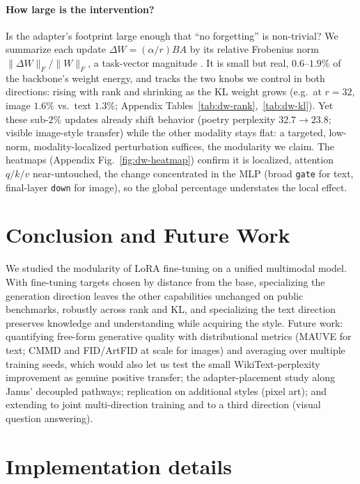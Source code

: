 \documentclass{article}
\begin{document}
\paragraph{How large is the intervention?}
Is the adapter's footprint large enough that ``no forgetting'' is non-trivial? We
summarize each update $\Delta W=(\alpha/r)BA$ by its relative Frobenius norm
$\lVert\Delta W\rVert_F/\lVert W\rVert_F$, a task-vector magnitude
\citep{ilharco2023task}. It is small but real, $0.6$--$1.9\%$ of the backbone's
weight energy, and tracks the two knobs we control in both directions: rising
with rank and shrinking as the KL weight grows (e.g.\ at $r{=}32$, image $1.6\%$
vs.\ text $1.3\%$; Appendix Tables~\ref{tab:dw-rank},~\ref{tab:dw-kl}). Yet these
sub-$2\%$ updates already shift behavior (poetry perplexity $32.7{\to}23.8$;
visible image-style transfer) while the other modality stays flat: a targeted,
low-norm, modality-localized perturbation suffices, the modularity we claim. The
heatmaps (Appendix Fig.~\ref{fig:dw-heatmap}) confirm it is localized, attention
$q/k/v$ near-untouched, the change concentrated in the MLP (broad \texttt{gate}
for text, final-layer \texttt{down} for image), so the global percentage
understates the local effect.
\section{Conclusion and Future Work}
We studied the modularity of LoRA fine-tuning on a unified multimodal model. With
fine-tuning targets chosen by distance from the base, specializing the generation
direction leaves the other capabilities unchanged on public benchmarks, robustly
across rank and KL, and specializing the text direction preserves knowledge and
understanding while acquiring the style. Future work: quantifying free-form
generative quality with distributional metrics (MAUVE for text; CMMD and
FID/ArtFID at scale for images) and averaging over multiple training seeds, which
would also let us test the small WikiText-perplexity improvement as genuine
positive transfer; the adapter-placement study along Janus' decoupled pathways;
replication on additional styles (pixel art); and extending to joint
multi-direction training and to a third direction (visual question answering).




\appendix

\section{Implementation details}
\label{app:impl}
\end{document}
